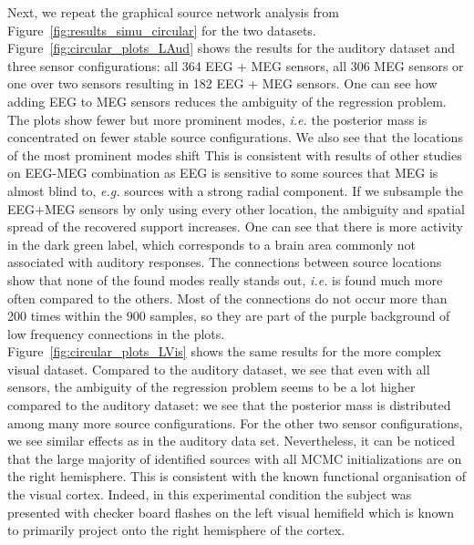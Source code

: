 Next, we repeat the graphical source network analysis from Figure~\ref{fig:results_simu_circular} for the two datasets. Figure~\ref{fig:circular_plots_LAud} shows the results for the auditory dataset and three sensor configurations: all 364 EEG + MEG sensors, all 306 MEG sensors or one over two sensors resulting in 182 EEG + MEG sensors. One can see how adding EEG to MEG sensors reduces the ambiguity of the regression problem. The plots show fewer but more prominent modes, \textit{i.e.} the posterior mass is concentrated on fewer stable source configurations. We also see that the locations of the most prominent modes shift
This is consistent with results of other studies on EEG-MEG combination \cite{MoStBrHa08,Lu14,AyVoKuHeKuGaHaWeKeRaWoHe14} as EEG is sensitive to some sources that MEG is almost blind to, \textit{e.g.} sources with a strong radial component. If we subsample the EEG+MEG sensors by only using every other location, the ambiguity and spatial spread of the recovered support increases. One can see that there is more activity in the dark green label, which corresponds to a brain area commonly not associated with auditory responses.%
The connections between source locations show that none of the found modes really stands out, \textit{i.e.} is found much more often compared to the others. Most of the connections do not occur more than 200 times within the 900 samples, so they are part of the purple background of low frequency connections in the plots.\\
Figure~\ref{fig:circular_plots_LVis} shows the same results for the more complex visual dataset. Compared to the auditory dataset, we see that even with all sensors, the ambiguity of the regression problem seems to be a lot higher compared to the auditory dataset: we see that the posterior mass is distributed among many more source configurations. For the other two sensor configurations, we see similar effects as in the auditory data set. Nevertheless, it can be noticed that the large majority of identified sources with all MCMC initializations are on the right hemisphere. This is consistent with the known functional organisation of the visual cortex. Indeed, in this experimental condition the subject was presented with checker board flashes on the left visual hemifield which is known to primarily project onto the right hemisphere of the cortex.


